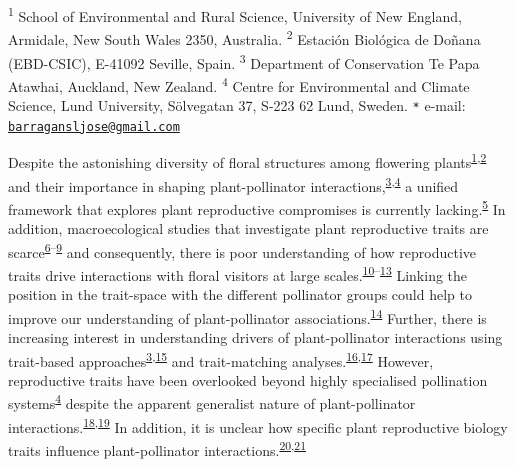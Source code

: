 \documentclass[
  12pt,
  a4paper,
]{article}
\begin{document}
\textsuperscript{1} School of Environmental and Rural Science, University of New England, Armidale, New South Wales 2350, Australia. \textsuperscript{2} Estación Biológica de Doñana (EBD-CSIC), E-41092 Seville, Spain. \textsuperscript{3} Department of Conservation \textbar{} Te Papa Atawhai, Auckland, New Zealand. \textsuperscript{4} Centre for Environmental and Climate Science, Lund University, Sölvegatan 37, S-223 62 Lund, Sweden. \texttt{*} e-mail: \href{mailto:barragansljose@gmail.com}{\nolinkurl{barragansljose@gmail.com}}

\doublespacing
\vspace{5mm}
\normalsize

Despite the astonishing diversity of floral structures among flowering plants\textsuperscript{\protect\hyperlink{ref-barrett2002}{1},\protect\hyperlink{ref-schiestl2013}{2}} and their importance in shaping plant-pollinator interactions,\textsuperscript{\protect\hyperlink{ref-fenster2004}{3},\protect\hyperlink{ref-dellinger2020}{4}} a unified framework that explores plant reproductive compromises is currently lacking.\textsuperscript{\protect\hyperlink{ref-roddy2021}{5}} In addition, macroecological studies that investigate plant reproductive traits are scarce\textsuperscript{\protect\hyperlink{ref-baude2016}{6}--\protect\hyperlink{ref-moeller2017}{9}} and consequently, there is poor understanding of how reproductive traits drive interactions with floral visitors at large scales.\textsuperscript{\protect\hyperlink{ref-sargent2008}{10}--\protect\hyperlink{ref-ruger2018}{13}} Linking the position in the trait-space with the different pollinator groups could help to improve our understanding of plant-pollinator associations.\textsuperscript{\protect\hyperlink{ref-dehling2016}{14}} Further, there is increasing interest in understanding drivers of plant-pollinator interactions using trait-based approaches\textsuperscript{\protect\hyperlink{ref-fenster2004}{3},\protect\hyperlink{ref-rosas2014}{15}} and trait-matching analyses.\textsuperscript{\protect\hyperlink{ref-stang2009}{16},\protect\hyperlink{ref-bartomeus2016}{17}} However, reproductive traits have been overlooked beyond highly specialised pollination systems\textsuperscript{\protect\hyperlink{ref-dellinger2020}{4}} despite the apparent generalist nature of plant-pollinator interactions.\textsuperscript{\protect\hyperlink{ref-waser1996}{18},\protect\hyperlink{ref-olesen2002}{19}} In addition, it is unclear how specific plant reproductive biology traits influence plant-pollinator interactions.\textsuperscript{\protect\hyperlink{ref-tur2013}{20},\protect\hyperlink{ref-devaux2014}{21}}
\end{document}
